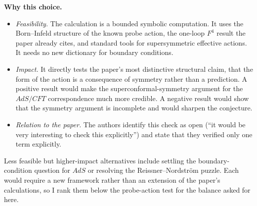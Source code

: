 \documentclass[11pt]{article}
\begin{document}
\textbf{Why this choice.}
\begin{itemize}
  \item \emph{Feasibility.} The calculation is a bounded symbolic computation. It uses the Born--Infeld structure of the known probe action, the one-loop $F^4$ result the paper already cites, and standard tools for supersymmetric effective actions. It needs no new dictionary for boundary conditions.
  \item \emph{Impact.} It directly tests the paper's most distinctive structural claim, that the form of the action is a consequence of symmetry rather than a prediction. A positive result would make the superconformal-symmetry argument for the $AdS/CFT$ correspondence much more credible. A negative result would show that the symmetry argument is incomplete and would sharpen the conjecture.
  \item \emph{Relation to the paper.} The authors identify this check as open (``it would be very interesting to check this explicitly'') and state that they verified only one term explicitly.
\end{itemize}

Less feasible but higher-impact alternatives include settling the boundary-condition question for $AdS$ or resolving the Reissner--Nordstr\"om puzzle. Each would require a new framework rather than an extension of the paper's calculations, so I rank them below the probe-action test for the balance asked for here.
\end{document}
